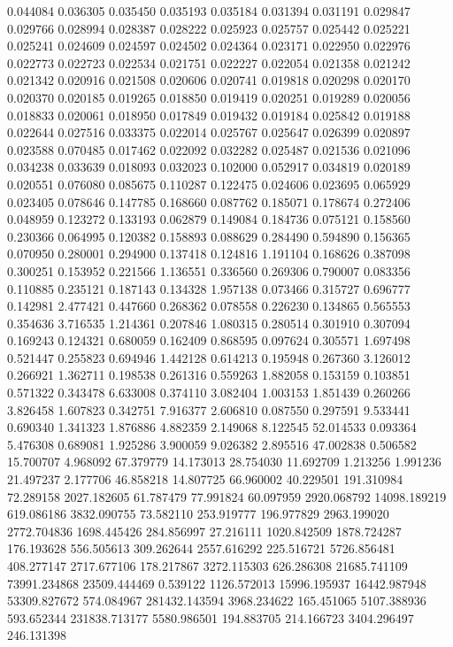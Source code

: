 0.044084
0.036305
0.035450
0.035193
0.035184
0.031394
0.031191
0.029847
0.029766
0.028994
0.028387
0.028222
0.025923
0.025757
0.025442
0.025221
0.025241
0.024609
0.024597
0.024502
0.024364
0.023171
0.022950
0.022976
0.022773
0.022723
0.022534
0.021751
0.022227
0.022054
0.021358
0.021242
0.021342
0.020916
0.021508
0.020606
0.020741
0.019818
0.020298
0.020170
0.020370
0.020185
0.019265
0.018850
0.019419
0.020251
0.019289
0.020056
0.018833
0.020061
0.018950
0.017849
0.019432
0.019184
0.025842
0.019188
0.022644
0.027516
0.033375
0.022014
0.025767
0.025647
0.026399
0.020897
0.023588
0.070485
0.017462
0.022092
0.032282
0.025487
0.021536
0.021096
0.034238
0.033639
0.018093
0.032023
0.102000
0.052917
0.034819
0.020189
0.020551
0.076080
0.085675
0.110287
0.122475
0.024606
0.023695
0.065929
0.023405
0.078646
0.147785
0.168660
0.087762
0.185071
0.178674
0.272406
0.048959
0.123272
0.133193
0.062879
0.149084
0.184736
0.075121
0.158560
0.230366
0.064995
0.120382
0.158893
0.088629
0.284490
0.594890
0.156365
0.070950
0.280001
0.294900
0.137418
0.124816
1.191104
0.168626
0.387098
0.300251
0.153952
0.221566
1.136551
0.336560
0.269306
0.790007
0.083356
0.110885
0.235121
0.187143
0.134328
1.957138
0.073466
0.315727
0.696777
0.142981
2.477421
0.447660
0.268362
0.078558
0.226230
0.134865
0.565553
0.354636
3.716535
1.214361
0.207846
1.080315
0.280514
0.301910
0.307094
0.169243
0.124321
0.680059
0.162409
0.868595
0.097624
0.305571
1.697498
0.521447
0.255823
0.694946
1.442128
0.614213
0.195948
0.267360
3.126012
0.266921
1.362711
0.198538
0.261316
0.559263
1.882058
0.153159
0.103851
0.571322
0.343478
6.633008
0.374110
3.082404
1.003153
1.851439
0.260266
3.826458
1.607823
0.342751
7.916377
2.606810
0.087550
0.297591
9.533441
0.690340
1.341323
1.876886
4.882359
2.149068
8.122545
52.014533
0.093364
5.476308
0.689081
1.925286
3.900059
9.026382
2.895516
47.002838
0.506582
15.700707
4.968092
67.379779
14.173013
28.754030
11.692709
1.213256
1.991236
21.497237
2.177706
46.858218
14.807725
66.960002
40.229501
191.310984
72.289158
2027.182605
61.787479
77.991824
60.097959
2920.068792
14098.189219
619.086186
3832.090755
73.582110
253.919777
196.977829
2963.199020
2772.704836
1698.445426
284.856997
27.216111
1020.842509
1878.724287
176.193628
556.505613
309.262644
2557.616292
225.516721
5726.856481
408.277147
2717.677106
178.217867
3272.115303
626.286308
21685.741109
73991.234868
23509.444469
0.539122
1126.572013
15996.195937
16442.987948
53309.827672
574.084967
281432.143594
3968.234622
165.451065
5107.388936
593.652344
231838.713177
5580.986501
194.883705
214.166723
3404.296497
246.131398
